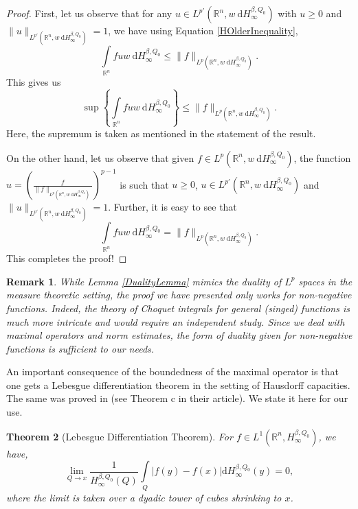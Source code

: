 \documentclass{amsart}
\newtheorem{theorem}{Theorem}
\newtheorem{remark}[theorem]{Remark}
\numberwithin{theorem}{section}
\numberwithin{equation}{section}
\begin{document}
		\begin{proof}
			First, let us observe that for any $u \in L^{p'} \left( \mathbb{R}^n, w \ \mathrm{d}H^{\beta, Q_0}_{\infty} \right)$ with $u \geq 0$ and $\| u \|_{L^{p'} \left( \mathbb{R}^n, w \ \mathrm{d}H^{\beta, Q_0}_{\infty} \right)} = 1$, we have using Equation \eqref{HOlderInequality},
			$$\int\limits_{\mathbb{R}^n} fuw \ \mathrm{d}H^{\beta, Q_0}_{\infty} \leq \| f \|_{L^p \left( \mathbb{R}^n, w \ \mathrm{d}H^{\beta, Q_0}_{\infty} \right)}.$$
			This gives us
			$$\sup \left\lbrace \int\limits_{\mathbb{R}^n} fuw \ \mathrm{d}H^{\beta, Q_0}_{\infty} \right\rbrace \leq \| f \|_{L^p \left( \mathbb{R}^n, w \ \mathrm{d}H^{\beta, Q_0}_{\infty} \right)}.$$
			Here, the supremum is taken as mentioned in the statement of the result.
			
			On the other hand, let us observe that given $f \in L^p \left( \mathbb{R}^n, w \ \mathrm{d}H^{\beta, Q_0}_{\infty} \right)$, the function $u = \left( \frac{f}{\| f \|_{L^p \left( \mathbb{R}^n, w \ \mathrm{d}H^{\beta, Q_0}_{\infty} \right)}} \right)^{p - 1}$ is such that $u \geq 0$, $u \in L^{p'} \left( \mathbb{R}^n, w \ \mathrm{d}H^{\beta, Q_0}_{\infty} \right)$ and $\| u \|_{L^{p'} \left( \mathbb{R}^n, w \ \mathrm{d}H^{\beta, Q_0}_{\infty} \right)} = 1$. Further, it is easy to see that
			$$\int\limits_{\mathbb{R}^n} fuw \ \mathrm{d}H^{\beta, Q_0}_{\infty} = \| f \|_{L^p \left( \mathbb{R}^n, w \ \mathrm{d}H^{\beta, Q_0}_{\infty} \right)}.$$
			This completes the proof!
		\end{proof}
		\begin{remark}
			\normalfont
			While Lemma \ref{DualityLemma} mimics the duality of $L^p$ spaces in the measure theoretic setting, the proof we have presented only works for non-negative functions. Indeed, the theory of Choquet integrals for general (singed) functions is much more intricate and would require an independent study. Since we deal with maximal operators and norm estimates, the form of duality given for non-negative functions is sufficient to our needs.
		\end{remark}
		An important consequence of the boundedness of the maximal operator is that one gets a Lebesgue differentiation theorem in the setting of Hausdorff capacities. The same was proved in \cite{Basak} (see Theorem c in their article). We state it here for our use.
		\begin{theorem}[Lebesgue Differentiation Theorem]
			\label{LDT}
			For $f \in L^1 \left( \mathbb{R}^n, H^{\beta, Q_0}_{\infty} \right)$, we have,
			\begin{equation}
				\label{LDTEquation}
				\lim\limits_{Q \rightarrow x} \frac{1}{H^{\beta, Q_0}_{\infty} \left( Q \right)} \int\limits_{Q} \left| f \left( y \right) - f \left( x \right) \right| \mathrm{d}H^{\beta, Q_0}_{\infty} \left( y \right) = 0,
			\end{equation}
			where the limit is taken over a dyadic tower of cubes shrinking to $x$.
		\end{theorem}
\end{document}
